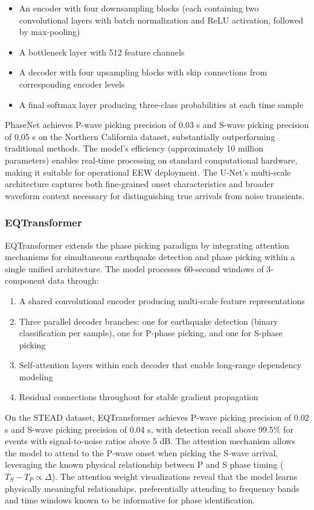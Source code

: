 \documentclass[review,authoryear]{elsarticle}
\begin{document}
\begin{itemize}
\item An encoder with four downsampling blocks (each containing two convolutional layers with batch normalization and ReLU activation, followed by max-pooling)
\item A bottleneck layer with 512 feature channels
\item A decoder with four upsampling blocks with skip connections from corresponding encoder levels
\item A final softmax layer producing three-class probabilities at each time sample
\end{itemize}

PhaseNet achieves P-wave picking precision of 0.03 s and S-wave picking precision of 0.05 s on the Northern California dataset, substantially outperforming traditional methods. The model's efficiency (approximately 10 million parameters) enables real-time processing on standard computational hardware, making it suitable for operational EEW deployment. The U-Net's multi-scale architecture captures both fine-grained onset characteristics and broader waveform context necessary for distinguishing true arrivals from noise transients.

\subsubsection{EQTransformer}

EQTransformer \citep{mousavi2020earthquake} extends the phase picking paradigm by integrating attention mechanisms for simultaneous earthquake detection and phase picking within a single unified architecture. The model processes 60-second windows of 3-component data through:

\begin{enumerate}
\item A shared convolutional encoder producing multi-scale feature representations
\item Three parallel decoder branches: one for earthquake detection (binary classification per sample), one for P-phase picking, and one for S-phase picking
\item Self-attention layers within each decoder that enable long-range dependency modeling
\item Residual connections throughout for stable gradient propagation
\end{enumerate}

On the STEAD dataset, EQTransformer achieves P-wave picking precision of 0.02 s and S-wave picking precision of 0.04 s, with detection recall above 99.5\% for events with signal-to-noise ratios above 5 dB. The attention mechanism allows the model to attend to the P-wave onset when picking the S-wave arrival, leveraging the known physical relationship between P and S phase timing ($T_S - T_P \propto \Delta$). The attention weight visualizations reveal that the model learns physically meaningful relationships, preferentially attending to frequency bands and time windows known to be informative for phase identification.
\end{document}
